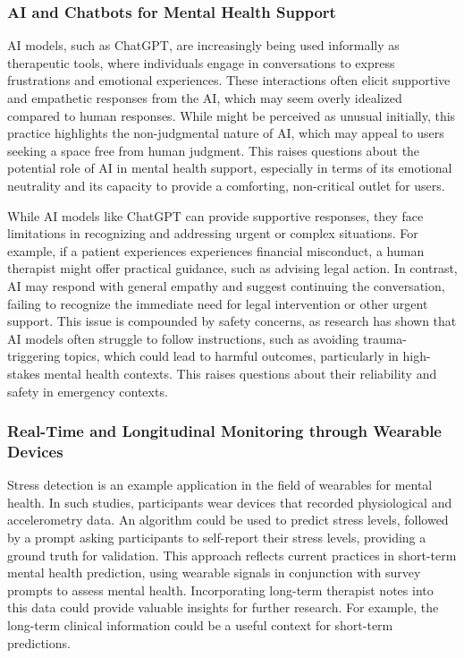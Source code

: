 \subsubsection{AI and Chatbots for Mental Health Support}

AI models, such as ChatGPT, are increasingly being used informally as therapeutic tools, where individuals engage in conversations to express frustrations and emotional experiences.  These interactions often elicit supportive and empathetic responses from the AI, which may seem overly idealized compared to human responses. While might be perceived as unusual initially, this practice highlights the non-judgmental nature of AI, which may appeal to users seeking a space free from human judgment. This raises questions about the potential role of AI in mental health support, especially in terms of its emotional neutrality and its capacity to provide a comforting, non-critical outlet for users.


While AI models like ChatGPT can provide supportive responses, they face limitations in recognizing and addressing urgent or complex situations. For example, if a patient experiences experiences financial misconduct, a human therapist might offer practical guidance, such as advising legal action. In contrast, AI may respond with general empathy and suggest continuing the conversation, failing to recognize the immediate need for legal intervention or other urgent support. 
This issue is compounded by safety concerns, as research has shown that AI models often struggle to follow instructions, such as avoiding trauma-triggering topics, which could lead to harmful outcomes, particularly in high-stakes mental health contexts.  This raises questions about their reliability and safety in emergency contexts.


\subsubsection{Real-Time and Longitudinal Monitoring through Wearable Devices}

Stress detection is an example application in the field of wearables for mental health. In such studies, participants wear devices that recorded physiological and accelerometry data. An algorithm could be used to predict stress levels, followed by a prompt asking participants to self-report their stress levels, providing a ground truth for validation. This approach reflects current practices in short-term mental health prediction, using wearable signals in conjunction with survey prompts to assess mental health. Incorporating long-term therapist notes into this data could provide valuable insights for further research. For example, the long-term clinical information could be a useful context for short-term predictions.


